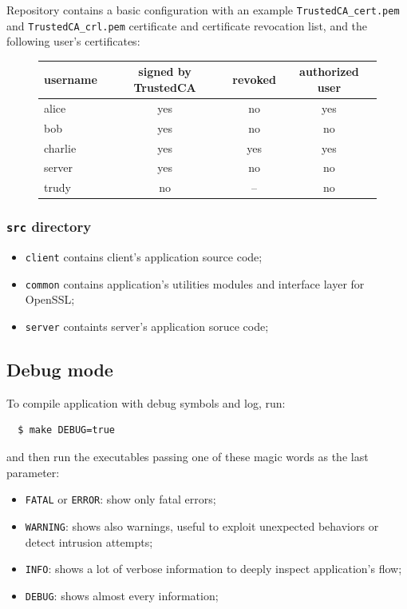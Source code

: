 \documentclass[a4paper,12pt]{article}
\begin{document}
Repository contains a basic configuration with an example \texttt{TrustedCA\_cert.pem} and \texttt{TrustedCA\_crl.pem} certificate and certificate revocation list, and the following user's certificates:
\begin{figure}[H]
\centering
\begin{tabular}{| l | c | c | c |}\hline
username  & signed by TrustedCA & revoked & authorized user \\ \hline
alice     & yes                 & no      & yes             \\ \hline
bob       & yes                 & no      & no              \\ \hline
charlie   & yes                 & yes     & yes             \\ \hline
server    & yes                 & no      & no              \\ \hline
trudy     & no                  & --      & no              \\ \hline
\end{tabular}
\end{figure}

\subsubsection{\texttt{src} directory}
\begin{itemize}
  \item \texttt{client} contains client's application source code;
  \item \texttt{common} contains application's utilities modules and interface layer for OpenSSL;
  \item \texttt{server} containts server's application soruce code;
\end{itemize}

\subsection{Debug mode}
To compile application with debug symbols and log, run:

\begin{verbatim}
  $ make DEBUG=true
\end{verbatim}

and then run the executables passing one of these magic words as the last parameter:

\begin{itemize}
  \item \texttt{FATAL} or \texttt{ERROR}: show only fatal errors;
  \item \texttt{WARNING}: shows also warnings, useful to exploit unexpected behaviors or detect intrusion attempts;
  \item \texttt{INFO}: shows a lot of verbose information to deeply inspect application's flow;
  \item \texttt{DEBUG}: shows almost every information;
\end{itemize}
\end{document}
